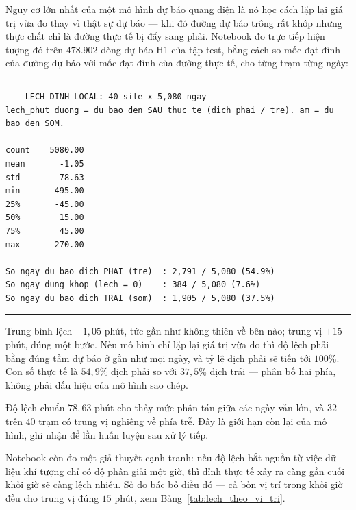 \documentclass[12pt,a4paper]{article}
\DeclareRobustCommand{\tep}[1]{\texttt{\detokenize{#1}}}
\renewcommand{\baselinestretch}{1.35}
\begin{document}
Nguy cơ lớn nhất của một mô hình dự báo quang điện là nó học cách lặp lại giá trị vừa đo thay
vì thật sự dự báo --- khi đó đường dự báo trông rất khớp nhưng thực chất chỉ là đường thực tế
bị đẩy sang phải. Notebook \tep{09_kiem_chung_tre_pha} đo trực tiếp hiện tượng đó trên
$478.902$ dòng dự báo H1 của tập test, bằng cách so mốc đạt đỉnh của đường dự báo với mốc đạt
đỉnh của đường thực tế, cho từng trạm từng ngày:

\begingroup
\par\vspace{6pt}\hrule\vspace{4pt}
\small\renewcommand{\baselinestretch}{1.0}\selectfont
\begin{verbatim}
--- LECH DINH LOCAL: 40 site x 5,080 ngay ---
lech_phut duong = du bao den SAU thuc te (dich phai / tre). am = du bao den SOM.

count    5080.00
mean       -1.05
std        78.63
min      -495.00
25%       -45.00
50%        15.00
75%        45.00
max       270.00

So ngay du bao dich PHAI (tre)  : 2,791 / 5,080 (54.9%)
So ngay dung khop (lech = 0)    : 384 / 5,080 (7.6%)
So ngay du bao dich TRAI (som)  : 1,905 / 5,080 (37.5%)
\end{verbatim}
\vspace{2pt}\hrule\par\vspace{6pt}
\endgroup

Trung bình lệch $-1{,}05$ phút, tức gần như không thiên về bên nào; trung vị $+15$ phút, đúng
một bước. Nếu mô hình chỉ lặp lại giá trị vừa đo thì độ lệch phải bằng đúng tầm dự báo ở gần
như mọi ngày, và tỷ lệ dịch phải sẽ tiến tới $100\%$. Con số thực tế là $54{,}9\%$ dịch phải so
với $37{,}5\%$ dịch trái --- phân bố hai phía, không phải dấu hiệu của mô hình sao chép.

Độ lệch chuẩn $78{,}63$ phút cho thấy mức phân tán giữa các ngày vẫn lớn, và $32$ trên $40$
trạm có trung vị nghiêng về phía trễ. Đây là giới hạn còn lại của mô hình, ghi nhận để lần huấn
luyện sau xử lý tiếp.

Notebook còn đo một giả thuyết cạnh tranh: nếu độ lệch bắt nguồn từ việc dữ liệu khí tượng chỉ
có độ phân giải một giờ, thì đỉnh thực tế xảy ra càng gần cuối khối giờ sẽ càng lệch nhiều.
Số đo bác bỏ điều đó --- cả bốn vị trí trong khối giờ đều cho trung vị đúng $15$ phút, xem Bảng~\ref{tab:lech_theo_vi_tri}.
\end{document}
